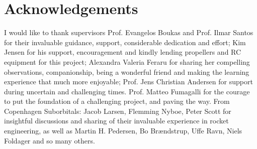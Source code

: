 \chapter{Acknowledgements}

I would like to thank supervisors Prof. Evangelos Boukas and Prof. Ilmar Santos for their invaluable guidance, support, considerable dedication and effort;
Kim Jensen for his support, encouragement and kindly lending propellers and RC equipment for this project; Alexandra Valeria Feraru for sharing her compelling observations, companionship, being a wonderful friend and making the learning experience that much more enjoyable;
Prof. Jens Christian Andersen for support during uncertain and challenging times. 
Prof. Matteo Fumagalli for the courage to put the foundation of a challenging project, and paving the way.
From Copenhagen Suborbitals: Jacob Larsen, Flemming Nyboe, Peter Scott for insightful discussions and sharing of their invaluable experience in rocket engineering, as well as Martin H. Pedersen, Bo Brændstrup, Uffe Ravn, Niels Foldager and so many others.


